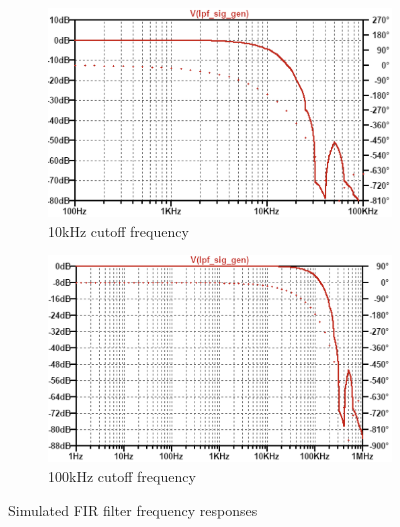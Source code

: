 \begin{figure}[H]
    \centering
    \begin{subfigure}[b]{0.48\textwidth}
        \centering
        \includegraphics[width=\textwidth]{FIR_10k.png}
        \caption{10kHz cutoff frequency}
        \label{fig:fir_10k}
    \end{subfigure}\hfill
    \begin{subfigure}[b]{0.48\textwidth}
        \centering
        \includegraphics[width=\textwidth]{FIR_100k.png}
        \caption{100kHz cutoff frequency}
        \label{fig:fir_100k}
    \end{subfigure}
    \caption{Simulated FIR filter frequency responses}
    \label{fig:lt_aa_freq}
\end{figure}

